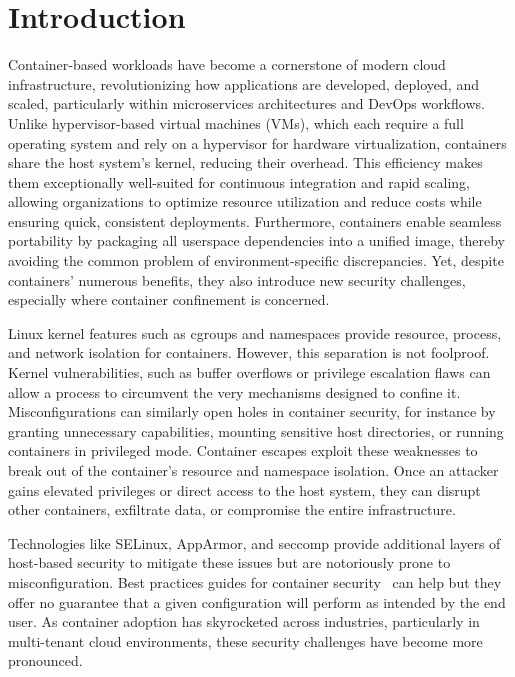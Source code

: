 \section{Introduction}

Container-based workloads have become a cornerstone of modern cloud infrastructure, revolutionizing how applications are developed, deployed, and scaled, particularly within microservices architectures and DevOps workflows. Unlike hypervisor-based virtual machines (VMs), which each require a full operating system and rely on a hypervisor for hardware virtualization, containers share the host system's kernel, reducing their overhead. This efficiency makes them exceptionally well-suited for continuous integration and rapid scaling, allowing organizations to optimize resource utilization and reduce costs while ensuring quick, consistent deployments. Furthermore, containers enable seamless portability by packaging all userspace dependencies into a unified image, thereby avoiding the common problem of environment-specific discrepancies. Yet, despite containers' numerous benefits, they also introduce new security challenges, especially where container confinement is concerned.

Linux kernel features such as cgroups and namespaces provide resource, process, and network isolation for containers. However, this separation is not foolproof. Kernel vulnerabilities, such as buffer overflows or privilege escalation flaws can allow a process to circumvent the very mechanisms designed to confine it. Misconfigurations can similarly open holes in container security, for instance by granting unnecessary capabilities, mounting sensitive host directories, or running containers in privileged mode. Container escapes exploit these weaknesses to break out of the container's resource and namespace isolation. Once an attacker gains elevated privileges or direct access to the host system, they can disrupt other containers, exfiltrate data, or compromise the entire infrastructure. 

Technologies like SELinux, AppArmor, and seccomp provide additional layers of host-based security to mitigate these issues but are notoriously prone to misconfiguration. Best practices guides for container security~\cite{CIS} can help but they offer no guarantee that a given configuration will perform as intended by the end user. As container adoption has skyrocketed across industries, particularly in multi-tenant cloud environments, these security challenges have become more pronounced.

